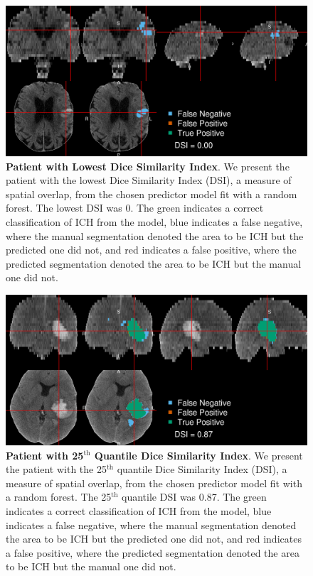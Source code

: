 \documentclass{elsarticle_nonatbib}\usepackage[]{graphicx}\usepackage[]{color}
\begin{document}
\begin{figure}
\centering
\includegraphics[width=\linewidth,keepaspectratio]{figures/Long/Reseg_Figure_DSI_Quantile_000_native.png}
\caption{{\bf Patient with  Lowest Dice Similarity Index}. We present the patient with the lowest Dice Similarity Index (DSI), a measure of spatial overlap, from the chosen predictor model fit with a random forest.  The lowest DSI was 0. The green indicates a correct classification of ICH from the model, blue indicates a false negative, where the manual segmentation denoted the area to be ICH but the predicted one did not, and red indicates a false positive, where the predicted segmentation denoted the area to be ICH but the manual one did not. }
\label{fig:dice_img0}
\end{figure}

 \begin{figure}
\centering
\includegraphics[width=\linewidth,keepaspectratio]{figures/Long/Reseg_Figure_DSI_Quantile_025_native.png}
\caption{{\bf Patient with  25$^{\text{th}}$ Quantile Dice Similarity Index}. We present the patient with the 25$^{\text{th}}$ quantile Dice Similarity Index (DSI), a measure of spatial overlap, from the chosen predictor model fit with a random forest.  The 25$^{\text{th}}$ quantile DSI was 0.87. The green indicates a correct classification of ICH from the model, blue indicates a false negative, where the manual segmentation denoted the area to be ICH but the predicted one did not, and red indicates a false positive, where the predicted segmentation denoted the area to be ICH but the manual one did not. }
\label{fig:dice_img25}
\end{figure}
\end{document}
